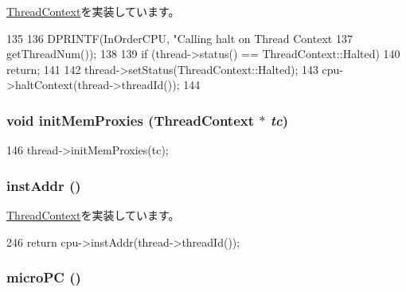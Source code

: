 \hyperlink{classThreadContext_a1cf6e868fcd49300a04acd0cae4fd142}{ThreadContext}を実装しています。


\begin{DoxyCode}
135 {
136     DPRINTF(InOrderCPU, "Calling halt on Thread Context %
137             getThreadNum());
138 
139     if (thread->status() == ThreadContext::Halted)
140         return;
141 
142     thread->setStatus(ThreadContext::Halted);
143     cpu->haltContext(thread->threadId());
144 }
\end{DoxyCode}
\hypertarget{classInOrderThreadContext_ab24719c7923d7d57030fa05bb166c62c}{
\subsubsection[{initMemProxies}]{\setlength{\rightskip}{0pt plus 5cm}void initMemProxies ({\bf ThreadContext} $\ast$ {\em tc})}}
\label{classInOrderThreadContext_ab24719c7923d7d57030fa05bb166c62c}



\begin{DoxyCode}
146     { thread->initMemProxies(tc); }
\end{DoxyCode}
\hypertarget{classInOrderThreadContext_a53c92716db281ae16ffb693c6d7803c7}{
\subsubsection[{instAddr}]{ instAddr ()}}
\label{classInOrderThreadContext_a53c92716db281ae16ffb693c6d7803c7}


\hyperlink{classThreadContext_a899644592f5027a7951cfd87b1c548a2}{ThreadContext}を実装しています。


\begin{DoxyCode}
246     { return cpu->instAddr(thread->threadId()); }
\end{DoxyCode}
\hypertarget{classInOrderThreadContext_a1a21696f33a7d38f251687ae0b5e9718}{
\subsubsection[{microPC}]{ microPC ()}}
\label{classInOrderThreadContext_a1a21696f33a7d38f251687ae0b5e9718}


